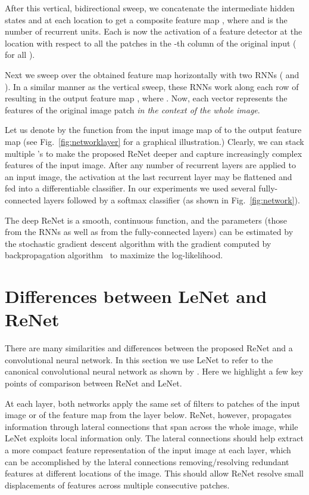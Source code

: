 \documentclass{article} \usepackage{nips15submit_e,times}
\begin{document}
After this vertical, bidirectional sweep, we concatenate the intermediate hidden 
states  and  at each location  to get a composite 
feature map , where 
 and  is the number of recurrent units.
Each  is now the activation of a feature detector at the location
 with respect to all the patches in the -th column of the original
input ( for all ).

Next we sweep over the obtained feature map  horizontally with two RNNs
( and ).
In a similar manner as the vertical sweep, these RNNs work along each row 
of  resulting in the output feature map , where
. Now, each vector  represents the features of
the original image patch  \emph{in the context of the whole image}.

Let us denote by  the function from the input image map of  to
the output feature map  (see Fig.~\ref{fig:networklayer} for a graphical
illustration.) Clearly, we can stack multiple 's to make the
proposed ReNet deeper and capture increasingly complex features of the input
image. After any number of recurrent layers are applied to an input image,
the activation at the last recurrent layer may be flattened and fed into a
differentiable classifier. In our experiments we used several 
fully-connected layers followed by a softmax classifier (as shown in Fig.~\ref{fig:network}).

The deep ReNet is a smooth, continuous function, and the parameters (those from
the RNNs as well as from the fully-connected layers) can be estimated by the
stochastic gradient descent algorithm with the gradient computed by
backpropagation algorithm~\citep[see, e.g.,][]{BP86} to maximize the
log-likelihood.

\section{Differences between LeNet and ReNet}
\label{sec:lenetrenet}

There are many similarities and differences between the proposed ReNet and a
convolutional neural network. In this section we use LeNet to refer to the
canonical convolutional neural network as shown by \citet{LeCun89}. Here we
highlight a few key points of comparison between ReNet and LeNet.

At each layer, both networks apply the same set of filters to patches of the
input image or of the feature map from the layer below. ReNet, however,
propagates information through lateral connections that span across the whole
image, while LeNet exploits local information only. The lateral connections
should help extract a more compact feature representation of the input image at
each layer, which can be accomplished by the lateral connections
removing/resolving redundant features at different locations of the image. This
should allow ReNet resolve small displacements of features across multiple
consecutive patches. 
\end{document}
